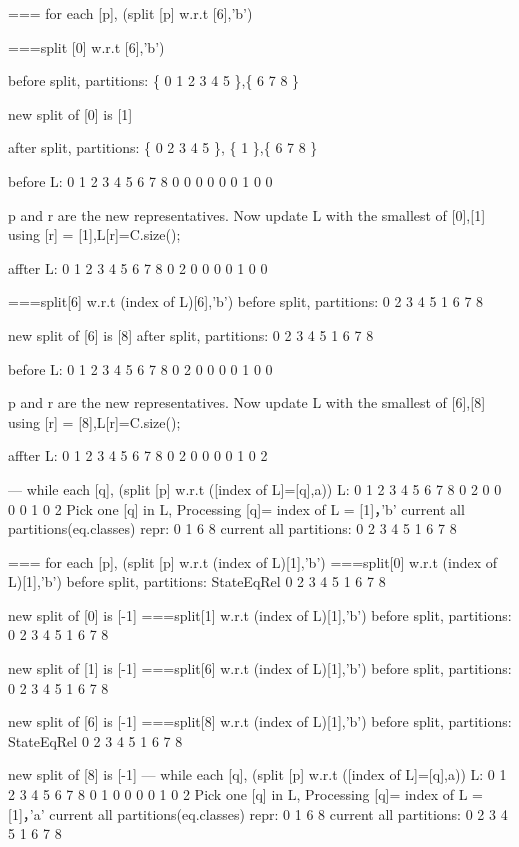 === for each [p], (split [p] w.r.t [6],'b')

===split [0] w.r.t [6],'b')

before split, partitions: \{ 0  1  2  3  4  5 \},\{ 6  7  8 \} 

new split of [0] is [1]

after split, partitions: \{ 0  2  3  4  5 \}, \{ 1 \},\{ 6  7  8 \}

before L:
0 1 2 3 4 5 6 7 8
0 0 0 0 0 0 1 0 0

p and r are the new representatives. Now update L with the smallest of [0],[1]
using [r] = [1],L[r]=C.size();

affter L:
0 1 2 3 4 5 6 7 8
0 2 0 0 0 0 1 0 0

===split[6] w.r.t (index of L)[6],'b')
before split, partitions:
{ 0  2  3  4  5 }
{ 1 }
{ 6  7  8 }

new split of [6] is [8]
after split, partitions:
{ 0  2  3  4  5 }
{ 1 }
{ 6  7 }
{ 8 }

before L:
0 1 2 3 4 5 6 7 8
0 2 0 0 0 0 1 0 0

p and r are the new representatives. Now update L with the smallest of [6],[8]
using [r] = [8],L[r]=C.size();

affter L:
0 1 2 3 4 5 6 7 8
0 2 0 0 0 0 1 0 2

--- while each [q], (split [p] w.r.t ([index of L]=[q],a))
L:
0 1 2 3 4 5 6 7 8
0 2 0 0 0 0 1 0 2
Pick one [q] in L, Processing [q]= index of L = [1]，'b'
current all partitions(eq.classes) repr:
{ 0  1  6  8 }
current all partitions:
{ 0  2  3  4  5 }
{ 1 }
{ 6  7 }
{ 8 }

=== for each [p], (split [p] w.r.t (index of L)[1],'b')
===split[0] w.r.t (index of L)[1],'b')
before split, partitions:
StateEqRel
{ 0  2  3  4  5 }
{ 1 }
{ 6  7 }
{ 8 }

new split of [0] is [-1]
===split[1] w.r.t (index of L)[1],'b')
before split, partitions:
{ 0  2  3  4  5 }
{ 1 }
{ 6  7 }
{ 8 }

new split of [1] is [-1]
===split[6] w.r.t (index of L)[1],'b')
before split, partitions:
{ 0  2  3  4  5 }
{ 1 }
{ 6  7 }
{ 8 }

new split of [6] is [-1]
===split[8] w.r.t (index of L)[1],'b')
before split, partitions:
StateEqRel
{ 0  2  3  4  5 }
{ 1 }
{ 6  7 }
{ 8 }

new split of [8] is [-1]
--- while each [q], (split [p] w.r.t ([index of L]=[q],a))
L:
0 1 2 3 4 5 6 7 8
0 1 0 0 0 0 1 0 2
Pick one [q] in L, Processing [q]= index of L = [1]，'a'
current all partitions(eq.classes) repr:
{ 0  1  6  8 }
current all partitions:
{ 0  2  3  4  5 }
{ 1 }
{ 6  7 }
{ 8 }


